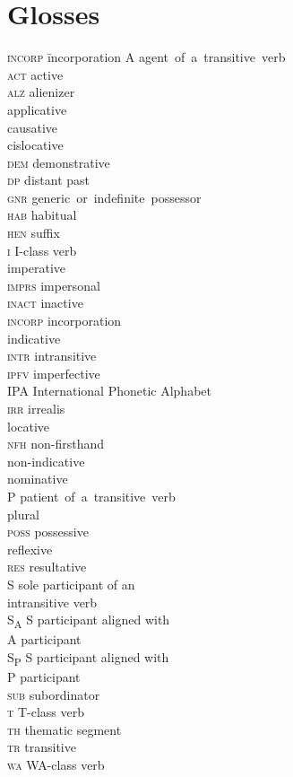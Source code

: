 \section*{Glosses}
\begin{multicols}{2}
\begin{tabbing}
\textsc{incorp} \= incorporation\kill
A \> \mbox{agent of a transitive verb}\\
\textsc{act} \> active\\
\textsc{alz} \> alienizer\\
\APPL \> applicative\\
\CAUS \> causative\\
\CISL \> cislocative\\
\textsc{dem} \> demonstrative\\
\textsc{dp} \> distant past\\
\textsc{gnr} \> \mbox{generic or indefinite possessor}\\
\textsc{hab} \> habitual\\
\textsc{hen} \> suffix \\
\textsc{i} \> I-class verb\\
\IMP \> imperative\\
\textsc{imprs} \> impersonal\\
\textsc{inact} \> inactive\\
\textsc{incorp} \> incorporation\\
\IND \> indicative\\
\textsc{intr} \> intransitive\\
\textsc{ipfv} \> imperfective\\
IPA \> International Phonetic Alphabet\\
\textsc{irr} \> irrealis\\
\LOC \> locative\\
\textsc{nfh} \> non-firsthand\\
\NIND \> non-indicative\\
\NOM \> nominative\\
P \> \mbox{patient of a transitive verb}\\
\PL \> plural\\
\textsc{poss} \> possessive\\
\REFL \> reflexive\\
\textsc{res} \> resultative\\
S \> sole participant of an \\ \> intransitive verb\\
S\textsubscript{A} \> S participant aligned with \\ \> A participant\\
S\textsubscript{P} \> S participant aligned with \\ \> P participant\\
\textsc{sub} \> subordinator\\
\textsc{t} \> T-class verb\\
\textsc{th} \> thematic segment\\
\textsc{tr} \> transitive\\
\textsc{wa} \> WA-class verb
\end{tabbing}
\end{multicols}
